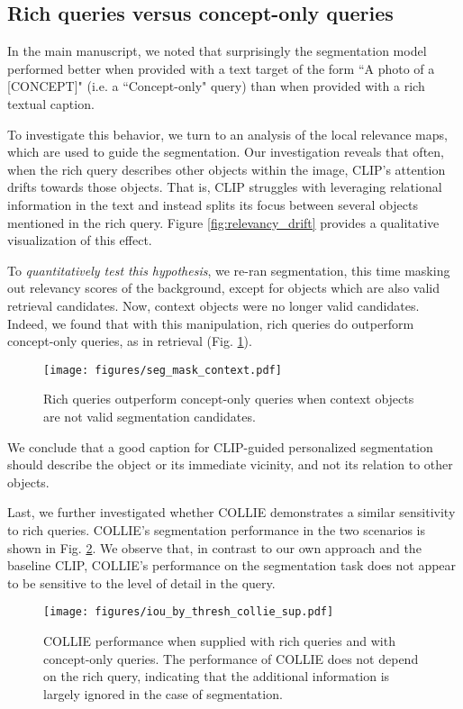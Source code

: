\documentclass[runningheads]{llncs}
\newcommand{\figref}[1]{Fig. \ref{#1}}
\newcommand\edit[1]{#1}
\newcommand{\concept}{[CONCEPT]}
\begin{document}
\subsection{Rich queries versus concept-only queries}
\label{app:rich_mask_vis}
In the main manuscript, we noted that surprisingly the segmentation model performed better when provided with a text target of the form ``A photo of a \concept{}" (i.e. a ``Concept-only" query) than when provided with a rich textual caption.

To investigate this behavior, we turn to an analysis of the local relevance maps, which are used to guide the segmentation. Our investigation reveals that often, when the rich query describes other objects within the image, CLIP's attention drifts towards those objects. That is, CLIP struggles with leveraging relational information in the text and instead splits its focus between several objects mentioned in the rich query. Figure \ref{fig:relevancy_drift} provides a qualitative visualization of this effect.

\edit{
To \textit{quantitatively test this hypothesis}, we re-ran segmentation, this time masking out relevancy scores of the background, except for objects which are also valid retrieval candidates. Now, context objects were no longer valid candidates. Indeed, we found that with this manipulation, rich queries do outperform concept-only queries, as in retrieval (Fig. \ref{fig:seg_mask_context}). }

\begin{figure}[htbp]
    \centering
    \texttt{[image: figures/seg\_mask\_context.pdf]}
    \caption{Rich queries
outperform concept-only
queries when context objects are not valid segmentation candidates.}
    \label{fig:seg_mask_context}
\end{figure}

We conclude that a good caption for CLIP-guided personalized segmentation should describe the object or its immediate vicinity, and not its relation to other objects.

Last, we further investigated whether COLLIE demonstrates a similar sensitivity to rich queries. COLLIE's segmentation performance in the two scenarios is shown in \figref{fig:collie_sup}. We observe that, in contrast to our own approach and the baseline CLIP, COLLIE's performance on the segmentation task does not appear to be sensitive to the level of detail in the query.

\begin{figure}[htbp]
    \centering
    \texttt{[image: figures/iou\_by\_thresh\_collie\_sup.pdf]}
    \caption{COLLIE performance when supplied with rich queries and with  concept-only queries. The performance of COLLIE does not depend on the rich query, indicating that the additional information is largely ignored in the case of segmentation.}
    \label{fig:collie_sup}
\end{figure}
\end{document}
